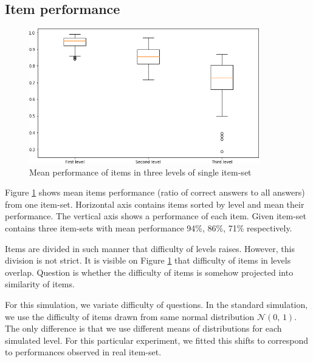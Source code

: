 \documentclass[
  digital, %
  table,   %
  nolof,     %
  nolot,     %
  nocover,
  color,
  final, %
]{fithesis3}
\begin{document}

\subsection{Item performance}\label{item-performance}

\begin{figure}
  \includegraphics[width=10cm]{img/items_performance_levels}
  \caption{Mean performance of items in three levels of single item-set}
  \label{fig:item_performance_levels}
\end{figure}

Figure \ref{fig:item_performance_levels} shows mean items performance (ratio of correct answers to all answers) from one item-set. Horizontal axis contains items sorted by level and mean their performance. The vertical axis shows a performance of each item. Given item-set contains three item-sets with mean performance 94\%, 86\%, 71\% respectively.

Items are divided in such manner that difficulty of levels raises. However, this division is not strict. It is visible on Figure \ref{fig:item_performance_levels} that difficulty of items in levels overlap. Question is whether the difficulty of items is somehow projected into similarity of items.

For this simulation, we variate difficulty of questions. In the standard simulation, we use the difficulty of items drawn from same normal distribution $\mathcal{N}(0,\,1)$. The only difference is that we use different means of distributions for each simulated level. For this particular experiment, we fitted this shifts to correspond to performances observed in real item-set.
\end{document}

